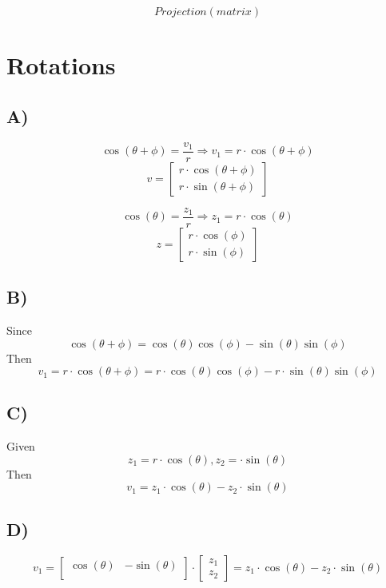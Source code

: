 \documentclass{article}
\begin{document}
$$Projection (matrix)$$

\section{Rotations}

\subsection*{A)}




$$	\cos(\theta + \phi) = \frac{v_1}{r} \Rightarrow v_1 = r \cdot \cos(\theta + \phi) $$
$$
	v= \begin{bmatrix}
		r \cdot \cos(\theta + \phi) \\
		r \cdot \sin(\theta + \phi)
	\end{bmatrix}
$$


$$	\cos(\theta) = \frac{z_1}{r} \Rightarrow z_1 = r \cdot \cos(\theta) $$
$$
	z= \begin{bmatrix}
		r \cdot \cos(\phi) \\
		r \cdot \sin(\phi)
	\end{bmatrix}
$$
\subsection*{B)}


Since
$$
	\cos(\theta + \phi) = \cos(\theta) \cos(\phi) - \sin(\theta) \sin(\phi)
$$
Then
$$
	v_1 = r \cdot \cos(\theta + \phi) = r \cdot \cos(\theta) \cos(\phi) - r \cdot \sin(\theta) \sin(\phi)
$$
\subsection*{C)}
Given
\[
	z_1 = r \cdot \cos(\theta) ,
	z_2 = \cdot \sin(\theta)
\]
Then
\[
	v_1 = z_1 \cdot \cos(\theta) - z_2 \cdot \sin(\theta)
\]

\subsection*{D)}

\[
	v_1 = \begin{bmatrix}
		\cos(\theta) & -\sin(\theta) \\
	\end{bmatrix}
	\cdot
	\begin{bmatrix}
		z_1 \\
		z_2
	\end{bmatrix}
	=
	z_1 \cdot \cos(\theta) - z_2 \cdot \sin(\theta)
\]
\end{document}
